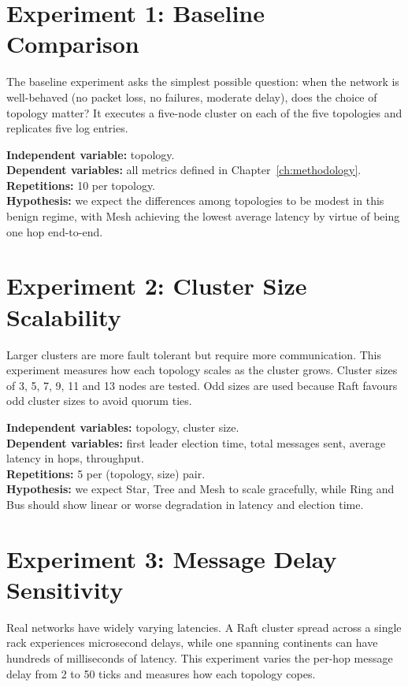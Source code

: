 \section{Experiment 1: Baseline Comparison}
\label{sec:exp1}

The baseline experiment asks the simplest possible question: when the network is well-behaved (no packet loss, no failures, moderate delay), does the choice of topology matter? It executes a five-node cluster on each of the five topologies and replicates five log entries.

\textbf{Independent variable:} topology.\\
\textbf{Dependent variables:} all metrics defined in Chapter~\ref{ch:methodology}.\\
\textbf{Repetitions:} 10 per topology.\\
\textbf{Hypothesis:} we expect the differences among topologies to be modest in this benign regime, with Mesh achieving the lowest average latency by virtue of being one hop end-to-end.

\section{Experiment 2: Cluster Size Scalability}
\label{sec:exp2}

Larger clusters are more fault tolerant but require more communication. This experiment measures how each topology scales as the cluster grows. Cluster sizes of 3, 5, 7, 9, 11 and 13 nodes are tested. Odd sizes are used because Raft favours odd cluster sizes to avoid quorum ties.

\textbf{Independent variables:} topology, cluster size.\\
\textbf{Dependent variables:} first leader election time, total messages sent, average latency in hops, throughput.\\
\textbf{Repetitions:} 5 per (topology, size) pair.\\
\textbf{Hypothesis:} we expect Star, Tree and Mesh to scale gracefully, while Ring and Bus should show linear or worse degradation in latency and election time.

\section{Experiment 3: Message Delay Sensitivity}
\label{sec:exp3}

Real networks have widely varying latencies. A Raft cluster spread across a single rack experiences microsecond delays, while one spanning continents can have hundreds of milliseconds of latency. This experiment varies the per-hop message delay from 2 to 50 ticks and measures how each topology copes.

